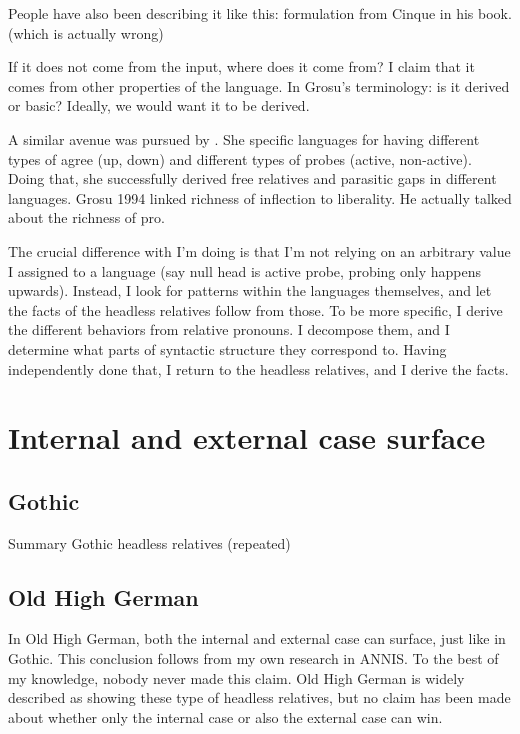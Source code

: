 People have also been describing it like this: formulation from Cinque in his book. (which is actually wrong)

If it does not come from the input, where does it come from? I claim that it comes from other properties of the language. In Grosu's terminology: is it derived or basic? Ideally, we would want it to be derived.

A similar avenue was pursued by \citealt{himmelreich2017}. She specific languages for having different types of agree (up, down) and different types of probes (active, non-active). Doing that, she successfully derived free relatives and parasitic gaps in different languages. Grosu 1994 linked richness of inflection to liberality. He actually talked about the richness of pro.


The crucial difference with I'm doing is that I'm not relying on an arbitrary value I assigned to a language (say null head is active probe, probing only happens upwards). Instead, I look for patterns within the languages themselves, and let the facts of the headless relatives follow from those. To be more specific, I derive the different behaviors from relative pronouns. I decompose them, and I determine what parts of syntactic structure they correspond to. Having independently done that, I return to the headless relatives, and I derive the facts.


\section{Internal and external case surface}

\subsection{Gothic}

\begin{table}[H]
  \center
  \caption{Summary Gothic headless relatives (repeated)}
    
    \label{tbl:summary-gothic-repeated}
\end{table}


\subsection{Old High German}

In Old High German, both the internal and external case can surface, just like in Gothic. This conclusion follows from my own research in ANNIS. To the best of my knowledge, nobody never made this claim. Old High German is widely described as showing these type of headless relatives, but no claim has been made about whether only the internal case or also the external case can win.

